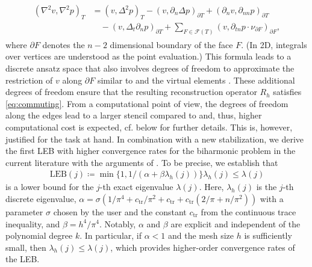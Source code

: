 \documentclass[a4paper]{amsart}
\numberwithin{equation}{section}
\theoremstyle{definition}
\theoremstyle{remark}
\numberwithin{theorem}{section}
\numberwithin{equation}{section}
\numberwithin{table}{section}
\numberwithin{figure}{section}
\begin{document}
\begin{align}\label{eq:ibp}
    \begin{aligned}
        (\nabla^2 v, \nabla^2 p)_T & = (v, \Delta^2 p)_T - (v, \partial_n\Delta p)_{\partial T} + (\partial_n v, \partial_{nn} p)_{\partial T} \\ &\quad - (v,\Delta_t\partial_n p)_{\partial T} + \sum_{F\in\mathcal{F}(T)} (v,\partial_{tn} p \cdot \nu_{\partial F})_{\partial F},
    \end{aligned}
\end{align}
where $\partial F$ denotes the $n-2$ dimensional boundary of the face $F$.
(In 2D, integrals over vertices are understood as the point evaluation.)
This formula leads to a discrete ansatz space that also involves degrees of freedom to approximate the restriction of $v$ along $\partial F$ similar to \cite{LiWangWangZhang2024} and the virtual elements \cite{BrezziMarini2013,ZhaoChenZhang2016,AntoniettiManziniVerani2018}.
These additional degrees of freedom ensure that the resulting reconstruction operator $R_h$ satisfies \eqref{eq:commuting}. From a computational point of view, the degrees of freedom along the edges lead to a larger stencil compared to \cite{DongErn2022} and, thus, higher computational cost is expected, cf.  below for further details. This is, however, justified for the task at hand.
In combination with a new stabilization, we derive the first LEB with higher convergence rates for the biharmonic problem in the current literature with the arguments of \cite{CarstensenZhaiZhang2020,Tran2024x2}.
To be precise,
we establish that
\begin{align}\label{ineq:LEB}
	\mathrm{LEB}(j) \coloneqq \min\{1,1/(\alpha +\beta\lambda_h(j))\}\lambda_h(j) \leq\lambda(j)
\end{align}
is a lower bound for the $j$-th exact eigenvalue $\lambda(j)$. Here, $\lambda_h(j)$ is the $j$-th discrete eigenvalue,
$\alpha =\sigma(1/\pi^4 + c_\mathrm{tr}/\pi^2 + c_\mathrm{tr} + c_\mathrm{tr}(2/\pi + n/\pi^2))$ with a parameter $\sigma$ chosen by the user and the constant $c_\mathrm{tr}$ from the continuous trace inequality, and $\beta =  h^4/\pi^4$. Notably, $\alpha$ and $\beta$ are explicit and independent of the polynomial degree $k$.
In particular, if $\alpha < 1$ and the mesh size $h$ is sufficiently small, then $\lambda_h(j) \leq \lambda(j)$, which provides higher-order convergence rates of the LEB.
\end{document}
